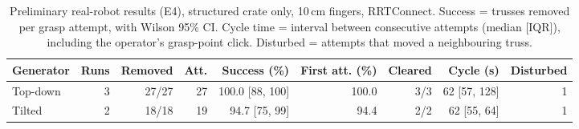 \begin{table}[htbp]
\centering
\small
\caption{Preliminary real-robot results (E4), structured crate only, 10\,cm fingers, RRTConnect. Success = trusses removed per grasp attempt, with Wilson 95\% CI. Cycle time = interval between consecutive attempts (median [IQR]), including the operator's grasp-point click. Disturbed = attempts that moved a neighbouring truss.}
\label{tab:e4_preliminary}
\setlength{\tabcolsep}{3pt}
\begin{tabular}{lrrrrrrrr}
\toprule
Generator & Runs & Removed & Att. & Success (\%) & First att. (\%) & Cleared & Cycle (s) & Disturbed \\
\midrule
Top-down & 3 & 27/27 & 27 & 100.0 [88, 100] & 100.0 & 3/3 & 62 [57, 128] & 1 \\
Tilted & 2 & 18/18 & 19 & 94.7 [75, 99] & 94.4 & 2/2 & 62 [55, 64] & 1 \\
\bottomrule
\end{tabular}
\end{table}
